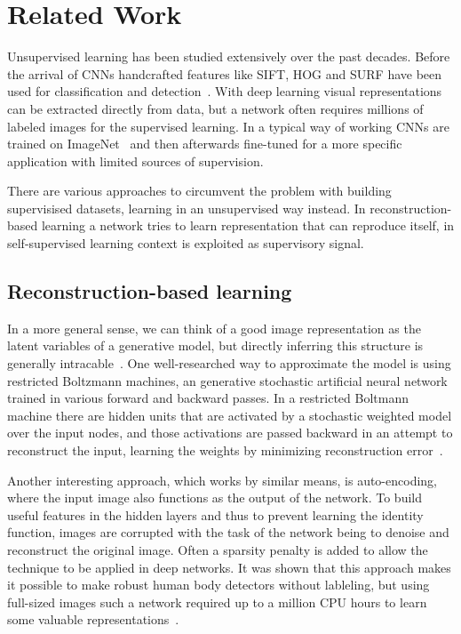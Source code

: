 %
\newpage
\chapter{Related Work}
\label{ch:related_work}
Unsupervised learning has been studied extensively over the past decades. Before the arrival of CNNs handcrafted features like SIFT, HOG and SURF have been used for classification and detection~\cite{lee2017}\needref. With deep learning visual representations can be extracted directly from data, but a network often requires millions of labeled images for the supervised learning. In a typical way of working CNNs are trained on ImageNet~\cite{deng2009} and then afterwards fine-tuned for a more specific application with limited sources of supervision. 

There are various approaches to circumvent the problem with building supervisised datasets, learning in an unsupervised way instead. In reconstruction-based learning a network tries to learn representation that can reproduce itself, in self-supervised learning context is exploited as supervisory signal.

\section{Reconstruction-based learning}
In a more general sense, we can think of a good image representation as the latent variables of a generative model, but directly inferring this structure is generally intracable~\cite{doersch2015}. One well-researched way to approximate the model is using restricted Boltzmann machines, an generative stochastic artificial neural network trained in various forward and backward passes. In a restricted Boltmann machine there are hidden units that are activated by a stochastic weighted model over the input nodes, and those activations are passed backward in an attempt to reconstruct the input, learning the weights by minimizing reconstruction error~\cite{smolensky1986}. 

Another interesting approach, which works by similar means, is auto-encoding, where the input image also functions as the output of the network. To build useful features in the hidden layers and thus to prevent learning the identity function, images are corrupted with the task of the network being to denoise and reconstruct the original image. Often a sparsity penalty is added to allow the technique to be applied in deep networks. It was shown that this approach makes it possible to make robust human body detectors without lableling, but using full-sized images such a network required up to a million CPU hours to learn some valuable representations~\cite{le2013}.  

